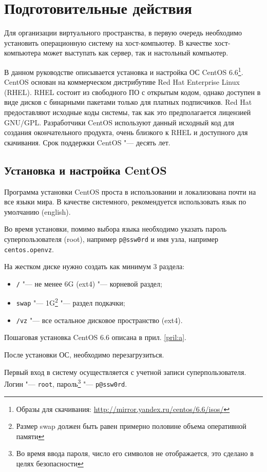 \section{Подготовительные действия}

Для организации виртуального пространства, в первую очередь необходимо установить операционную систему на хост-компьютер. 
В качестве хост-компьютера может выступать как сервер, так и настольный компьютер.

В данном руководстве описывается установка и настройка ОС CentOS 6.6\footnote{Образы для скачивания: \url{http://mirror.yandex.ru/centos/6.6/isos/}}.
CentOS основан на коммерческом дистрибутиве Red Hat Enterprise Linux (RHEL). 
RHEL состоит из свободного ПО с открытым кодом, однако доступен в виде дисков с бинарными пакетами только для платных подписчиков. 
Red Hat предоставляют исходные коды системы, так как это предполагается лицензией GNU/GPL.
Разработчики CentOS используют данный исходный код для создания окончательного продукта, очень близкого к RHEL и доступного для скачивания.
Срок поддержки CentOS "--- десять лет.

\subsection{Установка и настройка CentOS}
Программа установки CentOS проста в использовании и локализована почти на все языки мира. 
В качестве системного, рекомендуется использовать язык по умолчанию (english).

Во время установки, помимо выбора языка необходимо указать пароль суперпользователя (root), например \texttt{p@ssw0rd} и имя узла, например \texttt{centos.openvz}.

На жестком диске нужно создать как минимум 3 раздела:
\begin{itemize}
\item \texttt{/} "--- не менее 6G (ext4) "--- корневой раздел;
\item \texttt{swap} "--- 1G\footnote{Размер swap должен быть равен примерно половине объема оперативной памяти} "--- раздел подкачки;
\item \texttt{/vz} "--- все остальное дисковое пространство (ext4).
\end{itemize}

Пошаговая установка CentOS 6.6 описана в прил. \ref{pril:a}.

После установки ОС, необходимо перезагрузиться.

Первый вход в систему осуществляется с учетной записи суперпользователя. Логин "--- \texttt{root}, пароль\footnote{Во время ввода пароля, число его символов не отображается, это сделано в целях безопасности} "--- \texttt{p@ssw0rd}.

